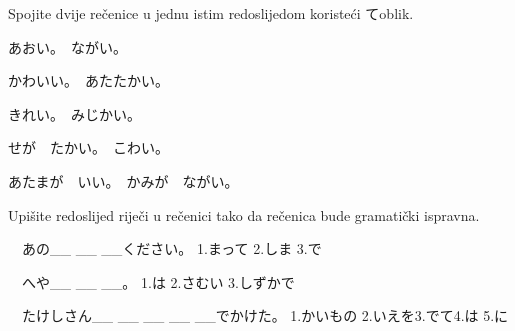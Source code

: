 

\author{Tomislav Mamić, Željka Ludošan}	%


	
	
	\begin{mondai}{Spojite dvije rečenice u jednu istim redoslijedom koristeći てoblik.}
		\item あおい。　ながい。
		\item かわいい。　あたたかい。
		\item きれい。　みじかい。
		\item せが　たかい。　こわい。
		\item あたまが　いい。　かみが　ながい。
	\end{mondai}

	\begin{mondai}{Upišite redoslijed riječi u rečenici tako da rečenica bude gramatički ispravna.
			
			\begin{reibun}[Primjer:]
		\end{reibun} }
		
		\item　あの\_\_ \_\_ \_\_ください。
		\vspace{10pt}
		\newline 1.まって 2.しま 3.で
		\vspace{20pt}
		\item　へや\_\_ \_\_ \_\_。
		\vspace{10pt}
		\newline 1.は 2.さむい 3.しずかで
		\vspace{20pt}
		\item　たけしさん\_\_ \_\_ \_\_ \_\_ \_\_でかけた。
		\vspace{10pt}
		\newline 1.かいもの 2.いえを3.でて4.は 5.に
	\end{mondai}

